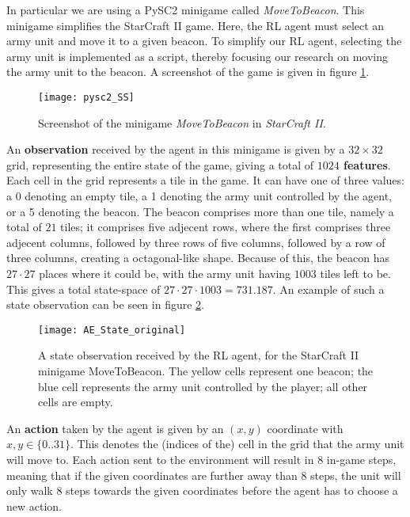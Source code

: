 In particular we are using a PySC2 minigame called \emph{MoveToBeacon}. This minigame simplifies the StarCraft II game. Here, the RL agent must select an army unit and move it to a given beacon. To simplify our RL agent, selecting the army unit is implemented as a script, thereby focusing our research on moving the army unit to the beacon. A screenshot of the game is given in figure \ref{fig:pysc2_SS}. 

\begin{figure}[h]
    \centering
    \texttt{[image: pysc2\_SS]}
    \caption{Screenshot of the minigame \emph{MoveToBeacon} in \emph{StarCraft II}.}
    \label{fig:pysc2_SS}
\end{figure}

An \textbf{observation} received by the agent in this minigame is given by a $32 \times 32$ grid, representing the entire state of the game, giving a total of \textbf{$1024$ features}. Each cell in the grid represents a tile in the game. It can have one of three values: a 0 denoting an empty tile, a 1 denoting the army unit controlled by the agent, or a 5 denoting the beacon. The beacon comprises more than one tile, namely a total of $21$ tiles; it comprises five adjecent rows, where the first comprises three adjecent columns, followed by three rows of five columns, followed by a row of three columns, creating a octagonal-like shape. Because of this, the beacon has $27 \cdot 27$ places where it could be, with the army unit having $1003$ tiles left to be. This gives a total state-space of $27 \cdot 27 \cdot 1003 = 731.187$. An example of such a state observation can be seen in figure \ref{fig:state_example}.

\begin{figure}[h]
    \centering
    \texttt{[image: AE\_State\_original]}
    \caption{A state observation received by the RL agent, for the StarCraft II minigame MoveToBeacon. The yellow cells represent one beacon; the blue cell represents the army unit controlled by the player; all other cells are empty.}
    \label{fig:state_example}
\end{figure}

An \textbf{action} taken by the agent is given by an $(x,y)$ coordinate with $x,y \in \{0 .. 31\}$. This denotes the (indices of the) cell in the grid that the army unit will move to. Each action sent to the environment will result in $8$ in-game steps, meaning that if the given coordinates are further away than 8 steps, the unit will only walk 8 steps towards the given coordinates before the agent has to choose a new action.

